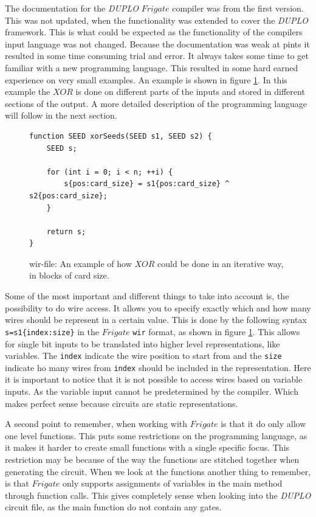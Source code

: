 \documentclass[twoside,11pt,openright]{report}
\newcommand{\DUPLO}{\textit{DUPLO} }
\begin{document}
The documentation for the \DUPLO $Frigate$ compiler was from the first version. This was not updated, when the functionality was extended to cover the \DUPLO framework. This is what could be expected as the functionality of the compilers input language was not changed. Because the documentation was weak at pints it resulted in some time consuming trial and error. It always takes some time to get familiar with a new programming language. This resulted in some hard earned experience on very small examples. An example is shown in figure \ref{fig:wir_ex}. In this example the $XOR$ is done on different parts of the inputs and stored in different sections of the output. A more detailed description of the programming language will follow in the next section.

\begin{figure}[t]
\begin{verbatim}
function SEED xorSeeds(SEED s1, SEED s2) {
    SEED s;
    
    for (int i = 0; i < n; ++i) {
        s{pos:card_size} = s1{pos:card_size} ^ s2{pos:card_size};
    }

    return s;
}
\end{verbatim}
\caption{wir-file: An example of how $XOR$ could be done in an iterative way, in blocks of card size.}
\label{fig:wir_ex}
\end{figure}

Some of the most important and different things to take into account is, the possibility to do wire access. It allows you to specify exactly which and how many wires should be represent in a certain value. This is done by the following syntax \verb|s=s1{index:size}| in the $Frigate$ \verb|wir| format, as shown in figure \ref{fig:wir_ex}. This allows for single bit inputs to be translated into higher level representations, like variables. The \verb|index| indicate the wire position to start from and the \verb|size| indicate ho many wires from \verb|index| should be included in the representation. Here it is important to notice that it is not possible to access wires based on variable inputs. As the variable input cannot be predetermined by the compiler. Which makes perfect sense because circuits are static representations.

A second point to remember, when working with $Frigate$ is that it do only allow one level functions. This puts some restrictions on the programming language, as it makes it harder to create small functions with a single specific focus. This restriction  may be because of the way the functions are stitched together when generating the circuit. When we look at the functions another thing to remember, is that $Frigate$ only supports assignments of variables in the main method through function calls. This gives completely sense when looking into the \DUPLO circuit file, as the main function do not contain any gates.
\end{document}
